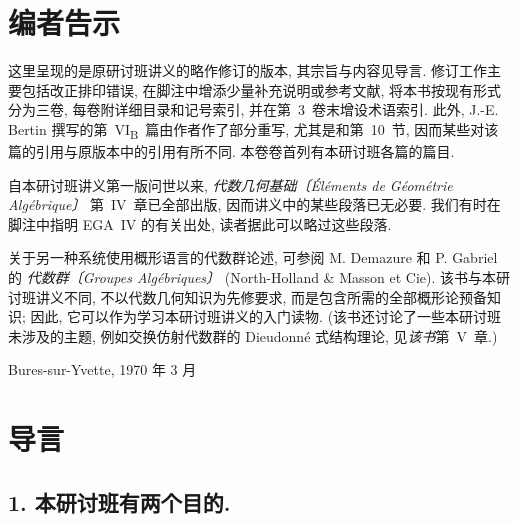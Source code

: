 
\begingroup
\newcommand{\SGAIIIIntroFootnote}[2]{%
  \begingroup
  \renewcommand{\thefootnote}{#1}%
  \footnote{#2}%
  \endgroup
}

\chapter*{编者告示}

这里呈现的是原研讨班讲义的略作修订的版本, 其宗旨与内容见导言.
修订工作主要包括改正排印错误, 在脚注中增添少量补充说明或参考文献,
将本书按现有形式分为三卷, 每卷附详细目录和记号索引, 并在第~3~卷末增设术语索引.
此外, J.-E. Bertin 撰写的第~VI\textsubscript{B}~篇由作者作了部分重写,
尤其是和第~10~节,
因而某些对该篇的引用与原版本中的引用有所不同. 本卷卷首列有本研讨班各篇的篇目.

自本研讨班讲义第一版问世以来, \emph{代数几何基础〔\'El\'ements de G\'eom\'etrie Alg\'ebrique〕}
第~IV~章已全部出版, 因而讲义中的某些段落已无必要. 我们有时在脚注中指明
EGA~IV 的有关出处, 读者据此可以略过这些段落.

关于另一种系统使用概形语言的代数群论述, 可参阅 M. Demazure 和 P. Gabriel 的
\emph{代数群〔Groupes Alg\'ebriques〕} (North-Holland \& Masson et Cie).
该书与本研讨班讲义不同, 不以代数几何知识为先修要求, 而是包含所需的全部概形论预备知识;
因此, 它可以作为学习本研讨班讲义的入门读物. (该书还讨论了一些本研讨班未涉及的主题,
例如交换仿射代数群的 Dieudonn\'e 式结构理论, 见\emph{该书}第~V~章.)

\begin{flushright}
Bures-sur-Yvette, 1970 年 3 月
\end{flushright}

\clearpage
\thispagestyle{empty}
\mbox{}
\clearpage

\chapter*{导言}

\section*{1. 本研讨班有两个目的.}

